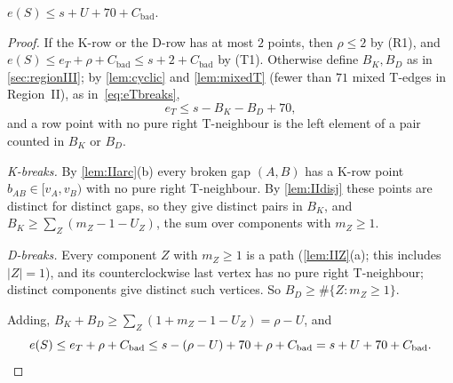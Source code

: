 \begin{theorem}\label{thm:IIBC}
$e(S)\le s+U+70+C_{\mathrm{bad}}$.
\end{theorem}
\begin{proof}
If the K-row or the D-row has at most $2$ points, then $\rho\le2$ by (R1), and $e(S)\le e_T+\rho+C_{\mathrm{bad}}\le s+2+C_{\mathrm{bad}}$ by (T1). Otherwise define $B_K,B_D$ as in \cref{sec:regionIII}; by \cref{lem:cyclic} and \cref{lem:mixedT} (fewer than $71$ mixed T-edges in Region~II), as in~\eqref{eq:eTbreaks},
\[
e_T\le s-B_K-B_D+70,
\]
and a row point with no pure right T-neighbour is the left element of a pair counted in $B_K$ or $B_D$.

\emph{K-breaks.} By \cref{lem:IIarc}(b) every broken gap $(A,B)$ has a K-row point $b_{AB}\in[v_A,v_B)$ with no pure right T-neighbour. By \cref{lem:IIdisj} these points are distinct for distinct gaps, so they give distinct pairs in $B_K$, and $B_K\ge\sum_Z(m_Z-1-U_Z)$, the sum over components with $m_Z\ge1$.

\emph{D-breaks.} Every component $Z$ with $m_Z\ge1$ is a path (\cref{lem:IIZ}(a); this includes $|Z|=1$), and its counterclockwise last vertex has no pure right T-neighbour; distinct components give distinct such vertices. So $B_D\ge\#\{Z:m_Z\ge1\}$.

Adding, $B_K+B_D\ge\sum_Z(1+m_Z-1-U_Z)=\rho-U$, and
\[
e(S)\le e_T+\rho+C_{\mathrm{bad}}\le s-(\rho-U)+70+\rho+C_{\mathrm{bad}}=s+U+70+C_{\mathrm{bad}}.\qedhere
\]
\end{proof}

